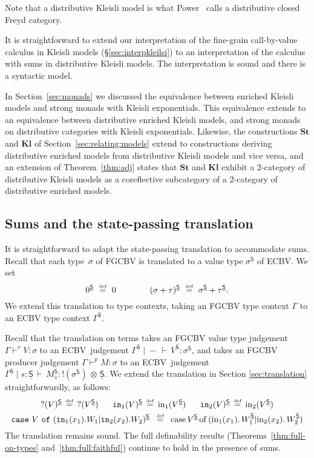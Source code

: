 \documentclass{LMCS}
\newcommand{\vj}[3]{#1 \mathrel{\vdash^{v}} #2 \colon \! #3}
\newcommand{\pj}[3]{#1 \mathrel{\vdash^p} #2 \colon \! #3}
\newcommand{\STA}{\sigma}
\newcommand{\STB}{\tau}
\newcommand{\EECarbstate}{\comptype{\mathsf{S}}}
\newcommand{\svar}s
\newcommand{\codefont}[1]{\mathtt{#1}}
\newcommand{\comptype}[1]{\underline{#1}}
\newcommand{\co}{\colon}
\newcommand{\tensor}{\otimes}
\newcommand{\ltensortype}[2]{{!} #1 \, {\tensor} \, #2}
\newcommand{\vimage}[1]{\mathrm{?}(#1)}
\newcommand{\cbvimage}[1]{\codefont{?}(#1)}
\newcommand{\rIn}[2]{#1 \colon  #2}
\newcommand{\aj}[4]{#1 \mid  \! #2 \, \vdash \, \rIn{#3}{#4}}
\newcommand{\tj}[3]{\aj{#1}{{-}}{#2}{#3}}
\newcommand{\ECBV}{ECBV}
\newcommand{\CBVtoEEC}[1]{#1^{\circ}}
\newcommand{\CBVtoEECbase}[2]{#2^{#1}}
\newcommand{\dKlmodel}{distributive Kleisli model}
\newcommand{\denrmodel}{distributive enriched model}
\newcommand{\FreydToECBV}{\mathbf{St}}
\newcommand{\ECBVToFreyd}{\mathbf{Kl}}
\newcommand{\defeq}{\mathrel{\,\stackrel{\mbox{\tiny{$\mathrm{def}$}}}=\,}}
\newcommand{\vin}[2]{{\mathrm{in}_{#1}}(#2)}
\newcommand{\vinl}[1]{\vin{1}{#1}}
\newcommand{\vinr}[1]{\vin{2}{#1}}
\newcommand{\vcase}[5]{{\mathrm{case}} \, #1 \,\mathrm{of}\,( \vinl{#2}. \, #3 |  \vinr{#4}. \, #5)}
\begin{document}
Note that a distributive Kleisli model is what 
Power~\cite[Def.~36]{Power:GenericModels:06}
calls a distributive closed Freyd category.

It is straightforward to extend our interpretation
of the fine-grain call-by-value calculus in Kleisli models
(\S\ref{sec:interpkleilsi})
 to an interpretation of 
the calculus with sums in distributive Kleisli models.
The interpretation is sound and there is a syntactic model.

In Section~\ref{sec:monads} we discussed the equivalence 
between enriched Kleisli models and strong monads with Kleisli exponentials.
This equivalence extends to an equivalence between 
distributive enriched Kleisli models, and strong monads on distributive 
categories with Kleisli exponentials. 
Likewise, the constructions $\FreydToECBV$ and 
$\ECBVToFreyd$ of Section~\ref{sec:relating:models} 
extend to constructions deriving {\denrmodel}s from 
{\dKlmodel}s and vice versa, and an extension of Theorem~\ref{thm:adj}
states that $\FreydToECBV$ and 
$\ECBVToFreyd$ exhibit a 2-category of distributive Kleisli models 
as a coreflective subcategory of a 2-category of distributive enriched models. 

\subsection{Sums and the state-passing translation}
\label{sec:sums-sps}
It is straightforward to adapt the state-passing translation to 
accommodate sums.
\renewcommand{\CBVtoEEC}{\CBVtoEECbase\EECarbstate}\renewcommand{\CBVtoEECV}{\CBVtoEECbase \EECarbstate}\renewcommand{\CBVtoEECP}[1]{\CBVtoEECbase \EECarbstate{#1}_\svar}Recall that each type~$\sigma$ of FGCBV is translated
to a value type $\CBVtoEEC\sigma$ of ECBV. We set
\[\CBVtoEEC{0}\,\defeq\,0\qquad\qquad
\CBVtoEEC{(\STA+\STB)} \, \defeq \,
\CBVtoEEC \STA+\CBVtoEEC \STB\text.\]
We extend this translation to type contexts,
taking an FGCBV type context $\Gamma$ to an
ECBV type context $\CBVtoEEC\Gamma$.

Recall that 
the translation on terms takes an FGCBV value type judgement
${\vj{\Gamma}{V}{\STA}}$  
to an \ECBV\ 
judgement ${\tj{\CBVtoEEC{\Gamma}}{\CBVtoEECV{V}}{\CBVtoEEC{\STA}}}$,
and takes an FGCBV producer judgement $\pj{\Gamma}{M}{\STA}$ 
to an \ECBV\ judgement ${\aj{\CBVtoEEC{\Gamma}}{s \co \EECarbstate}{\CBVtoEECP{M}}{\ltensortype{(\CBVtoEEC{\STA})}{\EECarbstate}}}$.
We extend the translation in Section \ref{sec:translation}
straightforwardly, as follows:
\begin{gather*}
\CBVtoEECV{\cbvimage V} \defeq \vimage{\CBVtoEECV V}
\ \quad\ 
\CBVtoEECV{\cbvin 1 V} \defeq \vin 1{\CBVtoEECV V}
\ \quad\ 
\CBVtoEECV{\cbvin 2 V} \defeq \vin 2{\CBVtoEECV V}
\\
\CBVtoEECV{\cbvcase V{x_1}{W_1}{x_2}{W_2}}
\ \defeq \ 
\vcase{\CBVtoEECV{V}}{x_1}{\CBVtoEECV{W_1}}{x_2}{\CBVtoEECV{W_2}}
\end{gather*}
The translation remains sound.
The full definability results (Theorems~\ref{thm:full-on-types}
and~\ref{thm:full:faithful}) continue to hold in the presence of sums.
\end{document}

